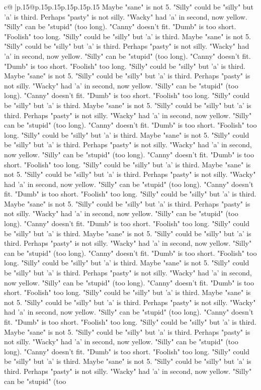 \documentclass{article}
\begin{document}
{\begin{supertabular}{c@{$\;$}|p{.15\linewidth}@{}p{.15\linewidth}p{.15\linewidth}p{.15\linewidth}p{.15\linewidth}p{.15\linewidth}}
{{{Maybe "sane" is not 5. "Silly" could be "silly" but 'a' is third. Perhaps "pasty" is not silly. "Wacky" had 'a' in second, now yellow. "Silly" can be "stupid" (too long). "Canny" doesn't fit. "Dumb" is too short. "Foolish" too long. "Silly" could be "silly" but 'a' is third. Maybe "sane" is not 5. "Silly" could be "silly" but 'a' is third. Perhaps "pasty" is not silly. "Wacky" had 'a' in second, now yellow. "Silly" can be "stupid" (too long). "Canny" doesn't fit. "Dumb" is too short. "Foolish" too long. "Silly" could be "silly" but 'a' is third. Maybe "sane" is not 5. "Silly" could be "silly" but 'a' is third. Perhaps "pasty" is not silly. "Wacky" had 'a' in second, now yellow. "Silly" can be "stupid" (too long). "Canny" doesn't fit. "Dumb" is too short. "Foolish" too long. "Silly" could be "silly" but 'a' is third. Maybe "sane" is not 5. "Silly" could be "silly" but 'a' is third. Perhaps "pasty" is not silly. "Wacky" had 'a' in second, now yellow. "Silly" can be "stupid" (too long). "Canny" doesn't fit. "Dumb" is too short. "Foolish" too long. "Silly" could be "silly" but 'a' is third. Maybe "sane" is not 5. "Silly" could be "silly" but 'a' is third. Perhaps "pasty" is not silly. "Wacky" had 'a' in second, now yellow. "Silly" can be "stupid" (too long). "Canny" doesn't fit. "Dumb" is too short. "Foolish" too long. "Silly" could be "silly" but 'a' is third. Maybe "sane" is not 5. "Silly" could be "silly" but 'a' is third. Perhaps "pasty" is not silly. "Wacky" had 'a' in second, now yellow. "Silly" can be "stupid" (too long). "Canny" doesn't fit. "Dumb" is too short. "Foolish" too long. "Silly" could be "silly" but 'a' is third. Maybe "sane" is not 5. "Silly" could be "silly" but 'a' is third. Perhaps "pasty" is not silly. "Wacky" had 'a' in second, now yellow. "Silly" can be "stupid" (too long). "Canny" doesn't fit. "Dumb" is too short. "Foolish" too long. "Silly" could be "silly" but 'a' is third. Maybe "sane" is not 5. "Silly" could be "silly" but 'a' is third. Perhaps "pasty" is not silly. "Wacky" had 'a' in second, now yellow. "Silly" can be "stupid" (too long). "Canny" doesn't fit. "Dumb" is too short. "Foolish" too long. "Silly" could be "silly" but 'a' is third. Maybe "sane" is not 5. "Silly" could be "silly" but 'a' is third. Perhaps "pasty" is not silly. "Wacky" had 'a' in second, now yellow. "Silly" can be "stupid" (too long). "Canny" doesn't fit. "Dumb" is too short. "Foolish" too long. "Silly" could be "silly" but 'a' is third. Maybe "sane" is not 5. "Silly" could be "silly" but 'a' is third. Perhaps "pasty" is not silly. "Wacky" had 'a' in second, now yellow. "Silly" can be "stupid" (too long). "Canny" doesn't fit. "Dumb" is too short. "Foolish" too long. "Silly" could be "silly" but 'a' is third. Maybe "sane" is not 5. "Silly" could be "silly" but 'a' is third. Perhaps "pasty" is not silly. "Wacky" had 'a' in second, now yellow. "Silly" can be "stupid" (too long). "Canny" doesn't fit. "Dumb" is too short. "Foolish" too long. "Silly" could be "silly" but 'a' is third. Maybe "sane" is not 5. "Silly" could be "silly" but 'a' is third. Perhaps "pasty" is not silly. "Wacky" had 'a' in second, now yellow. "Silly" can be "stupid" (too }}}
\end{supertabular}}
\end{document}
